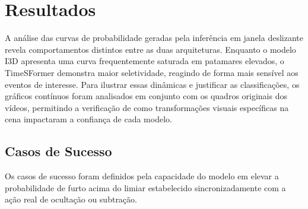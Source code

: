 \documentclass[12pt, %
openright, 
oneside, %
a4paper,    %
brazil]{facom-ufu-abntex2}
\begin{document}
\begin{table}[htbp]
\centering
\caption{Características dos vídeos reais de furto utilizados na avaliação.}
\label{tab:real_videos}
\end{table}

\section[Resultados]{Resultados}

A análise das curvas de probabilidade geradas pela inferência em janela deslizante revela comportamentos distintos entre as duas arquiteturas. Enquanto o modelo I3D apresenta uma curva frequentemente saturada em patamares elevados, o TimeSFormer demonstra maior seletividade, reagindo de forma mais sensível aos eventos de interesse. Para ilustrar essas dinâmicas e justificar as classificações, os gráficos contínuos foram analisados em conjunto com os quadros originais dos vídeos, permitindo a verificação de como transformações visuais específicas na cena impactaram a confiança de cada modelo.

\subsection[Casos de Sucesso]{Casos de Sucesso}

Os casos de sucesso foram definidos pela capacidade do modelo em elevar a probabilidade de furto acima do limiar estabelecido sincronizadamente com a ação real de ocultação ou subtração.
\end{document}

